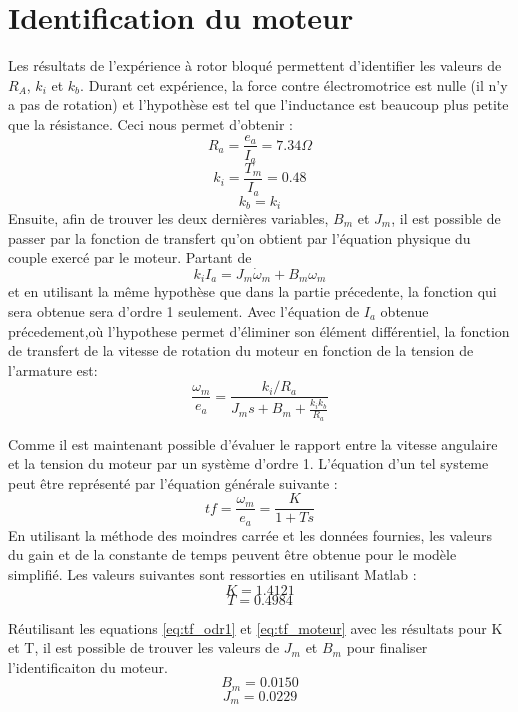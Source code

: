 \documentclass{udes_rapport} %
\begin{document}
\section{Identification du moteur}
Les résultats de l'expérience à rotor bloqué permettent d'identifier les valeurs de $R_A$, $k_i$ et $k_b$. Durant cet expérience, la force contre électromotrice est nulle (il n'y a pas de rotation) et l'hypothèse est tel que l'inductance est beaucoup plus petite que la résistance. Ceci nous permet d'obtenir :
\[	R_a = \frac{e_a}{I_a} = 7.34 \Omega	\]
\[	k_i = \frac{T_m}{I_a} =	0.48 		\]
\[	k_b = k_i							\]
Ensuite, afin de trouver les deux dernières variables, $B_m$ et $J_m$, il est possible de passer par la fonction de transfert qu'on obtient par l'équation physique du couple exercé par le moteur. Partant de 
\begin{equation}
k_i I_a = J_m \dot{\omega} _m + B_m \omega _m
\label{eq:torque}
\end{equation}
et en utilisant la même hypothèse que dans la partie précedente, la fonction qui sera obtenue sera d'ordre 1 seulement. Avec l'équation de $I_a$ obtenue précedement,où l'hypothese permet d'éliminer son élément différentiel, la fonction de transfert de la vitesse de rotation du moteur en fonction de la tension de l'armature est:
\begin{equation}
\frac{\omega_m}{e_a} = \frac{k_i/R_a}{J_m s + B_m + \frac{k_i k_b}{R_a}}
\label{eq:tf_moteur}
\end{equation}

Comme il est maintenant possible d'évaluer le rapport entre la vitesse angulaire et la tension du moteur par un système d'ordre 1. L'équation d'un tel systeme peut être représenté par l'équation générale suivante :
\begin{equation}
tf = \frac{\omega_m}{e_a} = \frac{K}{1+Ts}
\label{eq:tf_odr1}
\end{equation}
En utilisant la méthode des moindres carrée et les données fournies, les valeurs du gain et de la constante de temps peuvent être obtenue pour le modèle simplifié. Les valeurs suivantes sont ressorties en utilisant Matlab :
\[	K = 1.4121	\]
\[	T = 0.4984	\]

Réutilisant les equations \eqref{eq:tf_odr1} et \eqref{eq:tf_moteur} avec les résultats pour K et T, il est possible de trouver les valeurs de $J_m$ et $B_m$ pour finaliser l'identificaiton du moteur.
\[B_m = 0.0150	\]
\[J_m = 0.0229	\]
\end{document}
